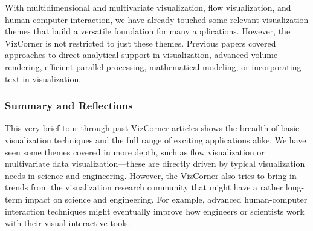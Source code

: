 \documentclass[10pt,journal,compsoc]{IEEEtran}
\begin{document}
With multidimensional and multivariate visualization, flow visualization, and human-computer interaction, we have already touched some relevant visualization themes that build a versatile foundation for many applications. However, the VizCorner is not restricted to just these themes. Previous papers covered approaches to direct analytical support in visualization, advanced volume rendering, efficient parallel processing, mathematical modeling, or incorporating text in visualization.  %





\subsubsection{Summary and Reflections}

This very brief tour through past VizCorner articles shows the breadth of basic visualization techniques and the full range of exciting applications alike. We have seen some themes covered in more depth, such as flow visualization or multivariate data visualization---these are directly driven by typical visualization needs in science and engineering. However, the VizCorner also tries to bring in trends from the visualization research community that might have a rather long-term impact on science and engineering. For example, advanced human-computer interaction techniques might eventually improve how engineers or scientists work with their visual-interactive tools. 
\end{document}
